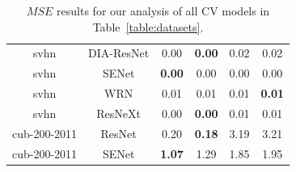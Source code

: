 \begin{table}[t]
\begin{center}
\begin{tabular}{|c|c|c|c|c|c|}
 svhn & DIA-ResNet  & 0.00 &  \textbf{0.00} & 0.02 & 0.02 \\
 svhn & SENet  & \textbf{0.00} &  0.00 & 0.00 & 0.00 \\
 svhn & WRN  & 0.01 &  0.01 & 0.01 & \textbf{0.01} \\
 svhn & ResNeXt  & 0.00 &  \textbf{0.00} & 0.01 & 0.01 \\
\hline
 cub-200-2011 & ResNet  & 0.20 &  \textbf{0.18} & 3.19 & 3.21 \\
 cub-200-2011 & SENet  & \textbf{1.07} &  1.29 & 1.85 & 1.95 \\
\hline
\end{tabular}
\end{center}
\vspace{-5mm}
\caption{$MSE$ results for our analysis of all CV models in Table~\ref{table:datasets}. }
\label{table:MSEresults}
\end{table}


